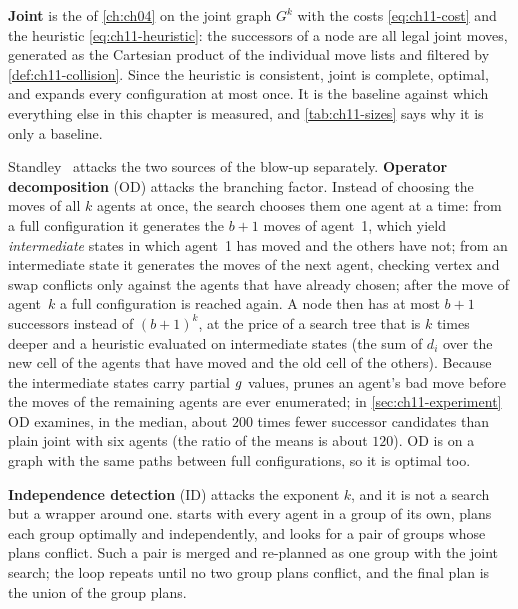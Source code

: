\textbf{Joint \astar} is the \astar of \cref{ch:ch04} on the
joint graph $G^k$ with the costs \cref{eq:ch11-cost} and the heuristic
\cref{eq:ch11-heuristic}: the successors of a node are all legal joint
moves, generated as the Cartesian product of the individual move lists and
filtered by \cref{def:ch11-collision}. Since the heuristic is consistent,
joint \astar is complete, optimal, and expands every configuration at most
once. It is the baseline against which everything else in this chapter is
measured, and \cref{tab:ch11-sizes} says why it is only a baseline.

Standley~\cite{standley2010finding} attacks the two sources of the blow-up
separately. \textbf{Operator decomposition}
(OD) attacks the branching factor. Instead of choosing the moves of all $k$
agents at once, the search chooses them one agent at a time: from a full
configuration it generates the $b+1$ moves of agent~1, which yield
\emph{intermediate} states in which agent~1 has moved and the others have
not; from an intermediate state it generates the moves of the next agent,
checking vertex and swap conflicts only against the agents that have already
chosen; after the move of agent~$k$ a full configuration is reached again. A
node then has at most $b+1$ successors instead of $(b+1)^k$, at the price of
a search tree that is $k$ times deeper and a heuristic evaluated on
intermediate states (the sum of $d_i$ over the new cell of the agents that
have moved and the old cell of the others). Because the intermediate states
carry partial $g$ values, \astar prunes an agent's bad move before the
moves of the remaining agents are ever enumerated; in
\cref{sec:ch11-experiment} OD examines, in the median, about $200$ times
fewer successor candidates than plain joint \astar with six agents (the
ratio of the means is about $120$). OD is \astar on a graph
with the same paths between full configurations, so it is optimal too.

\textbf{Independence detection} (ID) attacks
the exponent $k$, and it is not a search but a wrapper around one.
 starts with every agent in a group of its own, plans each
group optimally and independently, and looks for a pair of groups whose
plans conflict. Such a pair is merged and re-planned as one group with the
joint search; the loop repeats until no two group plans conflict, and the
final plan is the union of the group plans.

